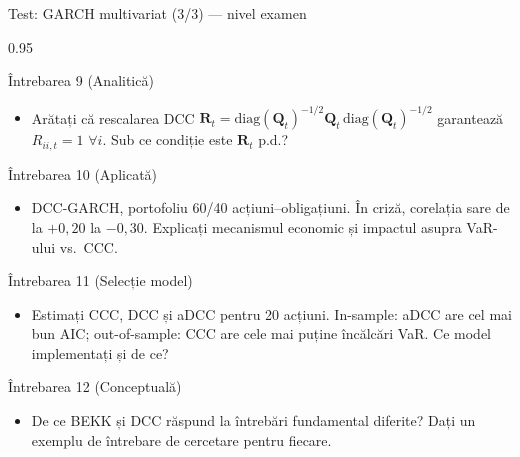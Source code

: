\documentclass[9pt, aspectratio=169, t]{beamer}
\begin{document}
\begin{frame}{Test: GARCH multivariat (3/3) --- nivel examen}
    \begin{cminipage}{0.95\textwidth}
    \vspace{-3mm}
    {\scriptsize
    \begin{block}{Întrebarea 9 (Analitică)}
        \begin{itemize}\setlength{\itemsep}{0pt}
            \item Arătați că rescalarea DCC $\mathbf{R}_t = \text{diag}(\mathbf{Q}_t)^{-1/2}\mathbf{Q}_t\,\text{diag}(\mathbf{Q}_t)^{-1/2}$ garantează $R_{ii,t} = 1$ $\forall i$. Sub ce condiție este $\mathbf{R}_t$ p.d.?
        \end{itemize}
    \end{block}
    \vspace{-2mm}
    \begin{block}{Întrebarea 10 (Aplicată)}
        \begin{itemize}\setlength{\itemsep}{0pt}
            \item DCC-GARCH, portofoliu 60/40 acțiuni--obligațiuni. În criză, corelația sare de la $+0{,}20$ la $-0{,}30$. Explicați mecanismul economic și impactul asupra VaR-ului vs.\ CCC.
        \end{itemize}
    \end{block}
    \vspace{-2mm}
    \begin{block}{Întrebarea 11 (Selecție model)}
        \begin{itemize}\setlength{\itemsep}{0pt}
            \item Estimați CCC, DCC și aDCC pentru 20 acțiuni. In-sample: aDCC are cel mai bun AIC; out-of-sample: CCC are cele mai puține încălcări VaR. Ce model implementați și de ce?
        \end{itemize}
    \end{block}
    \vspace{-2mm}
    \begin{block}{Întrebarea 12 (Conceptuală)}
        \begin{itemize}\setlength{\itemsep}{0pt}
            \item De ce BEKK și DCC răspund la întrebări fundamental diferite? Dați un exemplu de întrebare de cercetare pentru fiecare.
        \end{itemize}
    \end{block}
    }
    \end{cminipage}
\end{frame}
\end{document}
